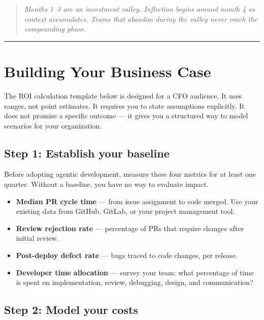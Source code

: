 \documentclass[
  a4paper,
  DIV=11,
  numbers=noendperiod]{scrreprt}
\providecommand{\tightlist}{%
  \setlength{\itemsep}{0pt}\setlength{\parskip}{0pt}}
\begin{document}
\begin{quote}
\emph{Months 1--3 are an investment valley. Inflection begins around
month 4 as context accumulates. Teams that abandon during the valley
never reach the compounding phase.}
\end{quote}

\begin{center}\rule{0.5\linewidth}{0.5pt}\end{center}

\section{Building Your Business Case}\label{building-your-business-case}

The ROI calculation template below is designed for a CFO audience. It
uses ranges, not point estimates. It requires you to state assumptions
explicitly. It does not promise a specific outcome --- it gives you a
structured way to model scenarios for your organization.

\subsection{Step 1: Establish your
baseline}\label{step-1-establish-your-baseline}

Before adopting agentic development, measure these four metrics for at
least one quarter. Without a baseline, you have no way to evaluate
impact.

\begin{itemize}
\tightlist
\item
  \textbf{Median PR cycle time} --- from issue assignment to code
  merged. Use your existing data from GitHub, GitLab, or your project
  management tool.
\item
  \textbf{Review rejection rate} --- percentage of PRs that require
  changes after initial review.
\item
  \textbf{Post-deploy defect rate} --- bugs traced to code changes, per
  release.
\item
  \textbf{Developer time allocation} --- survey your team: what
  percentage of time is spent on implementation, review, debugging,
  design, and communication?
\end{itemize}

\subsection{Step 2: Model your costs}\label{step-2-model-your-costs}
\end{document}
